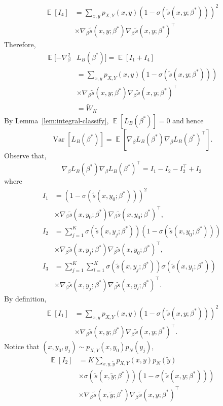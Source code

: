 \documentclass[11pt,a4paper]{article}
\DeclareMathOperator{\E}{\mathbb{E}}
\newcommand{\var}{\operatorname{Var}}
\newcommand{\wt}[1]{\widetilde{#1}}
\newcommand{\gbeta}{\nabla_{\beta}}
\newcommand{\sbc}[3]{\wt{s}(#1, #2; #3)}
\newcommand{\wbk}{\wt{W}_{K}}
\begin{document}
\begin{equation*}
\begin{aligned}
\E[I_4] & = \sum_{x, y}p_{X, Y}(x, y) (1-\sigma(\sbc{x}{y}{\beta^*}))^2 \\
& \times \gbeta\sbc{x}{y}{\beta^*}\gbeta\sbc{x}{y}{\beta^*}^\top
\end{aligned}
\end{equation*}
Therefore, 
\begin{equation*}
\begin{aligned}
\E[-\gbeta^2 & L_B (\beta^*)] = \E \left[I_1 + I_4\right] \\
& = \sum_{x, y} p_{X, Y}(x, y) (1-\sigma(\sbc{x}{y}{\beta^*})) \\ 
& \times \gbeta\sbc{x}{y}{\beta^*}\gbeta\sbc{x}{y}{\beta^*}^\top\\
& = \wbk
\end{aligned}
\end{equation*}
By Lemma~\ref{lem:integral-classify}, $\E [L_B(\beta^*)] = 0 $ and hence 
\[
\var \left[L_B(\beta^*)\right] = \E [\gbeta L_B(\beta^*) \gbeta L_B(\beta^*)^\top].
\]
Observe that,
\[
  \gbeta L_B(\beta^*) \gbeta L_B(\beta^*)^\top = I_1 - I_2 - I_2^\top + I_3
\]
where 
\begin{equation*}
\begin{aligned}
  I_1 & = (1-\sigma(\sbc{x}{y_0}{\beta^*}))^2 \\
  & \times \gbeta\sbc{x}{y_0}{\beta^*}\gbeta\sbc{x}{y_0}{\beta^*}^\top, \\
  I_2 & = \sum_{j=1}^K \sigma(\sbc{x}{y_j}{\beta^*})(1-\sigma(\sbc{x}{y_0}{\beta^*}))\\
  & \times \gbeta \sbc{x}{y_j}{\beta^*}\gbeta\sbc{x}{y_0}{\beta^*}^\top, \\
  I_3 & = \sum_{j=1}^K\sum_{l=1}^K \sigma(\sbc{x}{y_j}{\beta^*}) \sigma(\sbc{x}{y_l}{\beta^*}) \\
  & \times \gbeta \sbc{x}{y_j}{\beta^*}\gbeta \sbc{x}{y_l}{\beta^*}^\top.
\end{aligned}
\end{equation*}
By definition, 
\begin{equation*}
\begin{aligned}
\E[I_1] &= \sum_{x, y} p_{X, Y}(x, y)(1-\sigma(\sbc{x}{y}{\beta^*}))^2 \\
& \times \gbeta\sbc{x}{y}{\beta^*}\gbeta\sbc{x}{y}{\beta^*}^\top.
\end{aligned}
\end{equation*}
Notice that $(x, y_0, y_j)\sim p_{X, Y}(x, y_0)p_N(y_j)$, 
\begin{equation*}
\begin{aligned}
 \E[I_2] &= K \sum_{x, y, \wt{y}} p_{X, Y}(x, y)p_N(\wt{y}) \\
& \times \sigma(\sbc{x}{\wt{y}}{\beta^*})(1-\sigma(\sbc{x}{y}{\beta^*})) \\
& \times \gbeta \sbc{x}{\wt{y}}{\beta^*}\gbeta\sbc{x}{y}{\beta^*}^\top
\end{aligned}
\end{equation*}
\end{document}

